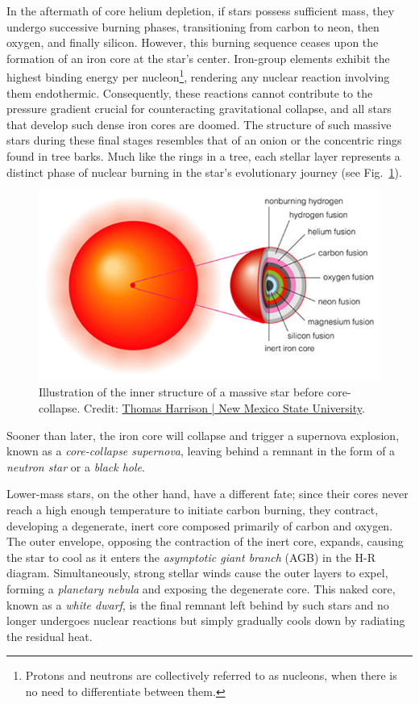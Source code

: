\documentclass[main.tex]{subfiles}
\begin{document}
    In the aftermath of core helium depletion, if stars possess sufficient mass, they undergo successive burning phases, transitioning from carbon to neon, then oxygen, and finally silicon. However, this burning sequence ceases upon the formation of an iron core at the star's center. Iron-group elements exhibit the highest binding energy per nucleon\footnote{Protons and neutrons are collectively referred to as nucleons, when there is no need to differentiate between them.}, rendering any nuclear reaction involving them endothermic. Consequently, these reactions cannot contribute to the pressure gradient crucial for counteracting gravitational collapse, and all stars that develop such dense iron cores are doomed. The structure of such massive stars during these final stages resembles that of an onion or the concentric rings found in tree barks. Much like the rings in a tree, each stellar layer represents a distinct phase of nuclear burning in the star's evolutionary journey (see Fig.~\ref{fig:stellar_structure}).
    \begin{figure}[hb!]
        \centering
        \includegraphics[scale=0.5]{figures/chapter1/high-mass-star-struct.jpeg}
        \caption{Illustration of the inner structure of a massive star before core-collapse. Credit: \href{http://astronomy.nmsu.edu/tharriso/ast110/}{Thomas Harrison | New Mexico State University}.}
        \label{fig:stellar_structure}
    \end{figure}
    Sooner than later, the iron core will collapse and trigger a supernova explosion, known as a \textit{core-collapse supernova}, leaving behind a remnant in the form of a \textit{neutron star} or a \textit{black hole}.
    
    Lower-mass stars, on the other hand, have a different fate; since their cores never reach a high enough temperature to initiate carbon burning, they contract, developing a degenerate, inert core composed primarily of carbon and oxygen. The outer envelope, opposing the contraction of the inert core, expands, causing the star to cool as it enters the \textit{asymptotic giant branch} (AGB) in the H-R diagram.
    Simultaneously, strong stellar winds cause the outer layers to expel, forming a \textit{planetary nebula} and exposing the degenerate core. This naked core, known as a \textit{white dwarf}, is the final remnant left behind by such stars and no longer undergoes nuclear reactions but simply gradually cools down by radiating the residual heat.
\end{document}
